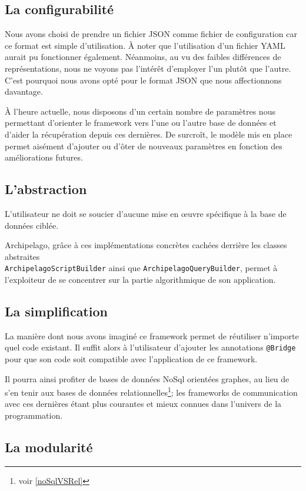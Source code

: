 \documentclass[a4paper,fleqn,12pt,oneside]{report}
\begin{document}
\subsection{La configurabilité}

Nous avons choisi de prendre un fichier JSON comme fichier de configuration car ce format est simple d'utilisation. À noter que l'utilisation d'un fichier YAML aurait pu fonctionner également. Néanmoins, au vu des faibles différences de représentations, nous ne voyons pas l'intérêt d'employer l'un plutôt que l'autre. C'est pourquoi nous avons opté pour le format JSON que nous affectionnons davantage. 

\`A l'heure actuelle, nous disposons d'un certain nombre de paramètres nous permettant d'orienter le framework vers l'une ou l'autre base de données et d'aider la récupération depuis ces dernières. De surcroît, le modèle mis en place permet aisément d'ajouter ou d'ôter de nouveaux paramètres en fonction des améliorations futures. 
\newpage
\subsection{L'abstraction}

L'utilisateur ne doit se soucier d'aucune mise en œuvre spécifique à la base de données ciblée. 

Archipelago, grâce à ces  implémentations concrètes cachées derrière les classes abstraites \\\texttt{ArchipelagoScriptBuilder} ainsi que \texttt{ArchipelagoQueryBuilder}, permet à l'exploiteur de se concentrer sur la partie algorithmique de son application.

\subsection{La simplification}

La manière dont nous avons imaginé ce framework permet de réutiliser n'importe quel code existant. Il suffit alors à l'utilisateur d'ajouter les annotations \texttt{@Bridge} pour que son code soit compatible avec l'application de ce framework. 

Il pourra ainsi profiter de bases de données NoSql orientées graphes, au lieu de s'en tenir aux bases de données relationnelles\footnote{voir \ref{noSqlVSRel}}; les frameworks de communication avec ces dernières étant plus courantes et mieux connues dans l'univers de la programmation.

\subsection{La modularité}
\end{document}
